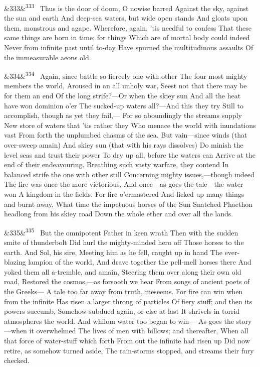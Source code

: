 \documentclass[12pt]{article}
\newcommand{\para}[1][]{\par\noindent\ifx&#1&\else\textsuperscript{\footnotesize #1}~\fi}
\begin{document}
\para[333] Thus is the door of doom, O nowise barred Against the sky, against the sun and earth And deep-sea waters, but wide open stands And gloats upon them, monstrous and agape. Wherefore, again, 'tis needful to confess That these same things are born in time; for things Which are of mortal body could indeed Never from infinite past until to-day Have spurned the multitudinous assaults Of the immeasurable aeons old.

\para[334] Again, since battle so fiercely one with other The four most mighty members the world, Aroused in an all unholy war, Seest not that there may be for them an end Of the long strife?---Or when the skiey sun And all the heat have won dominion o'er The sucked-up waters all?---And this they try Still to accomplish, though as yet they fail,--- For so aboundingly the streams supply New store of waters that 'tis rather they Who menace the world with inundations vast From forth the unplumbed chasms of the sea. But vain---since winds (that over-sweep amain) And skiey sun (that with his rays dissolves) Do minish the level seas and trust their power To dry up all, before the waters can Arrive at the end of their endeavouring. Breathing such vasty warfare, they contend In balanced strife the one with other still Concerning mighty issues,---though indeed The fire was once the more victorious, And once---as goes the tale---the water won A kingdom in the fields. For fire o'ermastered And licked up many things and burnt away, What time the impetuous horses of the Sun Snatched Phaethon headlong from his skiey road Down the whole ether and over all the lands.

\para[335] But the omnipotent Father in keen wrath Then with the sudden smite of thunderbolt Did hurl the mighty-minded hero off Those horses to the earth. And Sol, his sire, Meeting him as he fell, caught up in hand The ever-blazing lampion of the world, And drave together the pell-mell horses there And yoked them all a-tremble, and amain, Steering them over along their own old road, Restored the cosmos,---as forsooth we hear From songs of ancient poets of the Greeks--- A tale too far away from truth, meseems. For fire can win when from the infinite Has risen a larger throng of particles Of fiery stuff; and then its powers succumb, Somehow subdued again, or else at last It shrivels in torrid atmospheres the world. And whilom water too began to win--- As goes the story---when it overwhelmed The lives of men with billows; and thereafter, When all that force of water-stuff which forth From out the infinite had risen up Did now retire, as somehow turned aside, The rain-storms stopped, and streams their fury checked.
\end{document}
